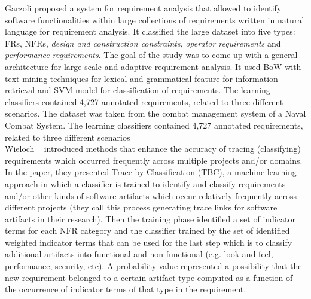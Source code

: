 Garzoli \cite {Garzoli:2013} proposed a system for requirement analysis that allowed to identify software functionalities within large collections of requirements written in natural language for requirement analysis. It classified the large dataset into five types:
FRs, NFRs, \emph{design and construction constraints}, \emph{operator
requirements} and \emph{performance requirements}.  The goal of the study was to come up with a general
architecture for large-scale and adaptive requirement analysis. It used BoW with text mining techniques for lexical and grammatical feature for information retrieval and SVM model for classification of requirements. The learning classifiers contained 4,727 annotated requirements, related
to three different scenarios. The dataset was taken from
the combat management system of a Naval Combat System. The learning classifiers contained 4,727 annotated requirements, related
to three different scenarios\\

Wieloch \etal~\cite{Wieloch:2013} introduced methods that enhance the accuracy
of tracing (classifying) requirements which occurred frequently across multiple
projects and/or domains. In the paper, they presented Trace by Classification
(TBC), a machine learning approach in which a classifier is trained to identify
and classify requirements and/or other kinds of software artifacts which occur
relatively frequently across different projects (they call this process
generating trace links for software artifacts in their research).  Then the training phase identified a set of indicator
terms for each NFR category and the classifier trained by the
set of identified weighted indicator terms that can be used for the last step which is to classify additional
artifacts into functional and non-functional (e.g.
look-and-feel, performance, security, etc). A probability value represented 
a possibility that the new requirement belonged to a certain artifact type
computed as a function of the occurrence of indicator terms of that type in the
requirement. \\

